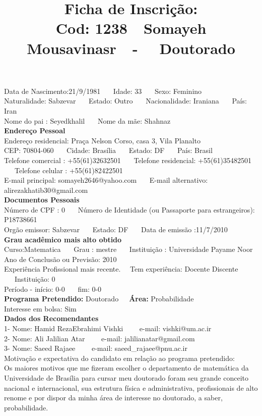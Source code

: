 \documentclass[11pt]{article}
\title{\vspace*{-4cm} Ficha de Inscrição: \\Cod: 1238\ \ Somayeh Mousavinasr\ \ - \ \ Doutorado 
 }
\date{}
\begin{document}
\maketitle
\vspace*{-1.5cm}
\noindent Data de Nascimento:21/9/1981
\ \ \ Idade: 33   \ \ \ Sexo: Feminino
\\
Naturalidade: Sabzevar  
\ \ \  Estado: Outro
\ \ \  Nacionalidade: Iraniana
\ \ \ País: Iran
\\        
Nome do pai : Seyedkhalil
\ \ \ Nome da mãe: Shahnaz          
\\[0.2cm]                     
\textbf{Endereço Pessoal} 
\\ 
\noindent Endereço residencial: Praça Nelson Corso, casa 3, Vila Planalto
\\
        CEP: 70804-060 
\ \ \ Cidade: Brasília 
\ \ \ Estado: DF 
\ \ \ País: Brasil
\\		
		Telefone comercial : +55(61)32632501
\ \ \ Telefone residencial: +55(61)35482501
\ \ \ Telefone celular : +55(61)82422501
\\
E-mail principal: somayeh2646@yahoo.com
\ \ \ E-mail alternativo: alirezakhatib30@gmail.com 
\\[0.2cm] 
\textbf{Documentos Pessoais}
\\
\noindent Número de CPF : 0
\ \ \ Número de Identidade (ou Passaporte para estrangeiros): P18738661
\\
Orgão emissor: Sabzevar
\ \ \ Estado: DF
\ \ \ Data de emissão :11/7/2010
\\[0.3cm]
\textbf{Grau acadêmico mais alto obtido}
\\	
Curso:Matematica
\ \ \ Grau : mestre
\ \ \ Instituição : Universidade Payame Noor
\\			
Ano de Conclusão ou Previsão: 2010
\\ 
Experiência Profissional mais recente. \ \  
Tem experiência: Docente Discente  
\ \ \ Instituição: 0
\\  
Período - início: 0-0
\ \ \ fim: 0-0
\\[0.2cm] 
\textbf{Programa Pretendido:} Doutorado\ \ \ \textbf{Área:} Probabilidade\\
Interesse em bolsa: Sim
\\[0.3cm]		
\textbf{Dados dos Recomendantes} 
\\
1- Nome: Hamid RezaEbrahimi Vishki
\ \ \ \  e-mail: vishki@um.ac.ir 
\\
2- Nome: Ali Jalilian Atar
\ \ \ \ e-mail: jalilianatar@gmail.com
\\
3- Nome: Saeed Rajaee
\ \ \ \ e-mail: saeed\_rajaee@pnu.ac.ir
\\[0.2cm]
Motivação e expectativa do candidato em relação ao programa pretendido:
\\Os maiores motivos que me fizeram escolher o departamento de matemática da Universidade de Brasília para cursar meu doutorado foram seu grande conceito nacional e internacional, sua estrutura física e administrativa, profissionais de alto renome e por dispor da minha área de interesse no doutorado, a saber, probabilidade.
\end{document}
